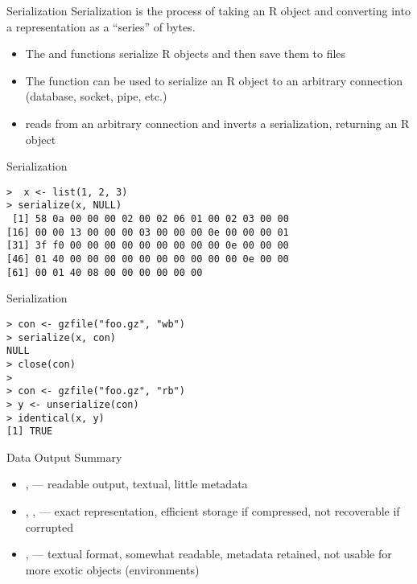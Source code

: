 \documentclass[aspectratio=169]{beamer}
\begin{document}
\begin{frame}{Serialization}
Serialization is the process of taking an R object and converting into
a representation as a ``series'' of bytes.  
\begin{itemize}
\item
The  and  functions serialize R objects
and then save them to files
\item
The  function can be used to serialize an R object to
an arbitrary connection (database, socket, pipe, etc.)
\item
{} reads from an arbitrary connection and inverts a
serialization, returning an R object
\end{itemize}
\end{frame}


\begin{frame}[fragile]{Serialization}
\begin{verbatim}
>  x <- list(1, 2, 3)
> serialize(x, NULL)
 [1] 58 0a 00 00 00 02 00 02 06 01 00 02 03 00 00
[16] 00 00 13 00 00 00 03 00 00 00 0e 00 00 00 01
[31] 3f f0 00 00 00 00 00 00 00 00 00 0e 00 00 00
[46] 01 40 00 00 00 00 00 00 00 00 00 00 0e 00 00
[61] 00 01 40 08 00 00 00 00 00 00
\end{verbatim}
\end{frame}

\begin{frame}[fragile]{Serialization}
\begin{verbatim}
> con <- gzfile("foo.gz", "wb")
> serialize(x, con)
NULL
> close(con)
>
> con <- gzfile("foo.gz", "rb")
> y <- unserialize(con)
> identical(x, y)
[1] TRUE
\end{verbatim}
\end{frame}


\begin{frame}{Data Output Summary}
\begin{itemize}
\item
{},  --- readable output, textual,
little metadata
\item
{}, ,  --- exact
representation, efficient storage if compressed, not recoverable if
corrupted
\item
{},  --- textual format, somewhat readable,
metadata retained, not usable for more exotic objects (environments)
\end{itemize}
\end{frame}
\end{document}
